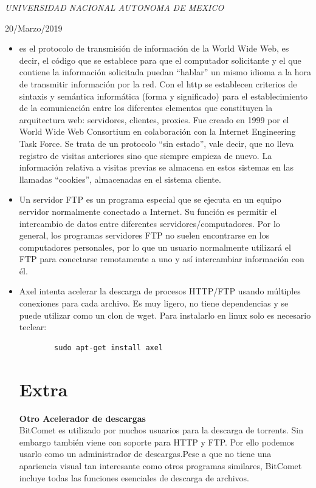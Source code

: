 \documentclass[a4paper, 11pt, oneside]{article}
\begin{document}
\begin{titlepage}
	\textit{UNIVERSIDAD NACIONAL AUTONOMA DE MEXICO} 
	
	\vfill
	
	
	
	
	\vspace{0.3\baselineskip} 
	
	20/Marzo/2019 
	
	 

\end{titlepage}
\begin{itemize}
    \item es el protocolo de transmisión de información de la World Wide Web, es decir, el código que se establece para que el computador solicitante y el que contiene la información solicitada puedan “hablar” un mismo idioma a la hora de transmitir información por la red. Con el http se establecen criterios de sintaxis y semántica informática (forma y significado) para el establecimiento de la comunicación entre los diferentes elementos que constituyen la arquitectura web: servidores, clientes, proxies. Fue creado en 1999 por el World Wide Web Consortium en colaboración con la Internet Engineering Task Force. Se trata de un protocolo “sin estado”, vale decir, que no lleva registro de visitas anteriores sino que siempre empieza de nuevo. La información relativa a visitas previas se almacena en estos sistemas en las llamadas “cookies”, almacenadas en el sistema cliente.
    \item Un servidor FTP es un programa especial que se ejecuta en un equipo servidor normalmente conectado a Internet. Su función es permitir el intercambio de datos entre diferentes servidores/computadores. Por lo general, los programas servidores FTP no suelen encontrarse en los computadores personales, por lo que un usuario normalmente utilizará el FTP para conectarse remotamente a uno y así intercambiar información con él.
    \item Axel intenta acelerar la descarga de procesos HTTP/FTP usando múltiples conexiones para cada archivo. Es muy ligero, no tiene dependencias y se puede utilizar como un clon de wget.
    Para instalarlo en linux solo es necesario teclear:
    \begin{verbatim}
        sudo apt-get install axel
    \end{verbatim}
\section*{Extra}
\textbf{Otro Acelerador de descargas}\\
BitComet es utilizado por muchos usuarios para la descarga de torrents. Sin embargo también viene con soporte para HTTP y FTP. Por ello podemos usarlo como un administrador de descargas.Pese a que no tiene una apariencia visual tan interesante como otros programas similares, BitComet incluye todas las funciones esenciales de descarga de archivos.
\end{itemize}
\end{document}
